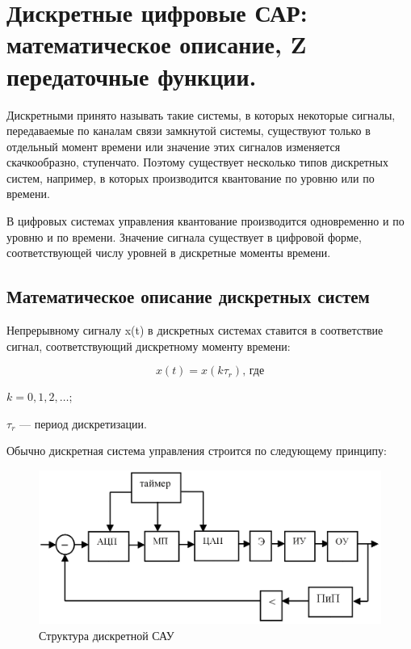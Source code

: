 \documentclass[unicode, 12pt, a4paper, oneside]{article}
\begin{document}
\section{Дискретные цифровые САР: математическое описание, Z передаточные функции.}

Дискретными принято называть такие системы, в которых некоторые сигналы, передаваемые по каналам связи замкнутой системы, существуют только в отдельный момент времени или значение этих сигналов изменяется скачкообразно, ступенчато. Поэтому существует несколько типов дискретных систем, например, в которых производится квантование по уровню или по времени. %

В цифровых системах управления квантование производится одновременно и по уровню и по времени. Значение сигнала существует в цифровой форме, соответствующей числу уровней в дискретные моменты времени. %

\subsection*{Математическое описание дискретных систем}

Непрерывному сигналу x(t) в дискретных системах ставится в соответствие сигнал, соответствующий дискретному моменту времени:

\begin{equation}
x(t) = x(k\tau_r) \text{, где}
\end{equation}
\par $ k = 0, 1, 2, \ldots $;\nopagebreak
\par $ \tau_r $ --- период дискретизации.

Обычно дискретная система управления строится по следующему принципу:

\begin{figure}[H]
\centering
\includegraphics[width=0.7\linewidth]{21_dicret_struct.png}
\caption{Структура дискретной САУ}
\label{fig:21_dicret_struct}
\end{figure}
\end{document}

